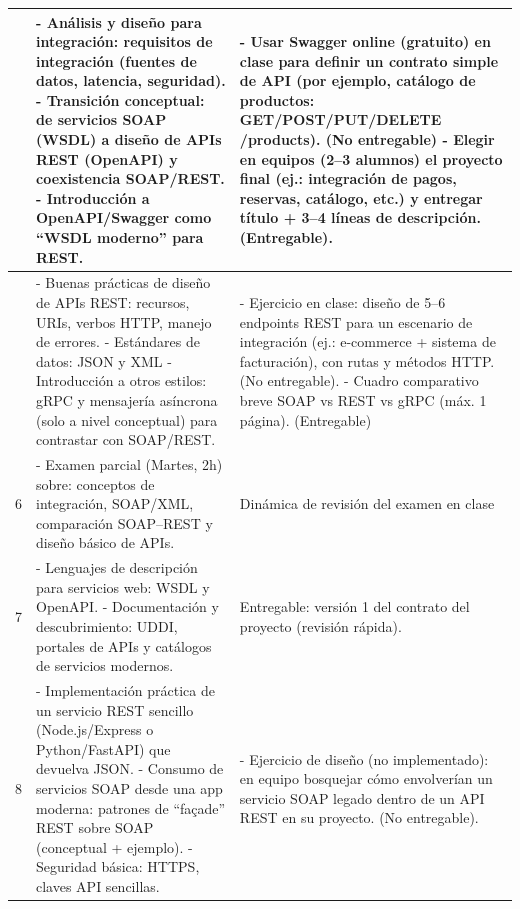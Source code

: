 \documentclass[12pt]{article}
\begin{document}
\begin{longtable}{|>{\centering\arraybackslash}p{1.5cm}|p{6.7cm}|p{6.7cm}|}
		4 &
		- Análisis y diseño para integración: requisitos de integración (fuentes de datos, latencia, seguridad).
		\newline- Transición conceptual: de servicios SOAP (WSDL) a diseño de APIs REST (OpenAPI) y coexistencia SOAP/REST.
		\newline- Introducción a OpenAPI/Swagger como “WSDL moderno” para REST.
		&
		- Usar Swagger online (gratuito) en clase para definir un contrato simple de API (por ejemplo, catálogo de productos: GET/POST/PUT/DELETE /products). (No entregable)
		\newline- Elegir en equipos (2–3 alumnos) el proyecto final (ej.: integración de pagos, reservas, catálogo, etc.) y entregar título + 3–4 líneas de descripción. (Entregable). \\
		\hline
		
		5 &
		- Buenas prácticas de diseño de APIs REST: recursos, URIs, verbos HTTP, manejo de errores.
		\newline- Estándares de datos: JSON y XML
		\newline- Introducción a otros estilos: gRPC y mensajería asíncrona (solo a nivel conceptual) para contrastar con SOAP/REST.
		 &
		- Ejercicio en clase: diseño de 5–6 endpoints REST para un escenario de integración (ej.: e-commerce + sistema de facturación), con rutas y métodos HTTP. (No entregable). 
		\newline- Cuadro comparativo breve SOAP vs REST vs gRPC (máx. 1 página). (Entregable) \\
		\hline
		
		6 &
		- Examen parcial (Martes, 2h) sobre: conceptos de integración, SOAP/XML, comparación SOAP–REST y diseño básico de APIs.
		 &
		Dinámica de revisión del examen en clase  \\
		\hline
		
		7 &
		- Lenguajes de descripción para servicios web: WSDL y OpenAPI.
		\newline- Documentación y descubrimiento: UDDI, portales de APIs y catálogos de servicios modernos.
		&
		Entregable: versión 1 del contrato del proyecto (revisión rápida).  \\
		\hline
		
		8 &
		- Implementación práctica de un servicio REST sencillo (Node.js/Express o Python/FastAPI) que devuelva JSON.
		\newline- Consumo de servicios SOAP desde una app moderna: patrones de “façade” REST sobre SOAP (conceptual + ejemplo).
		\newline- Seguridad básica: HTTPS, claves API sencillas.
		 &
		- Ejercicio de diseño (no implementado): en equipo bosquejar cómo envolverían un servicio SOAP legado dentro de un API REST en su proyecto. (No entregable). \\
		\hline
		

\end{longtable}
\end{document}
